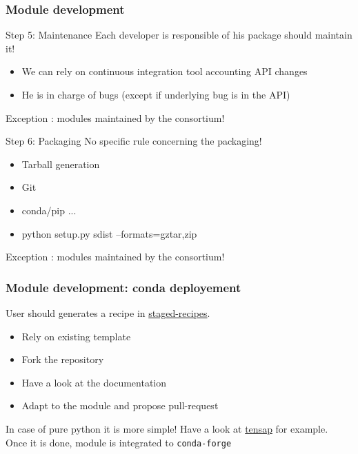 \documentclass[8pt]{beamer}
\begin{document}
\begin{frame}
  \frametitle{Module development}
  \begin{block}{Step 5: Maintenance}
    Each developer is responsible of his package should maintain it!
    \begin{itemize}
    \item We can rely on continuous integration tool accounting API changes
    \item He is in charge of bugs (except if underlying bug is in the API)
    \end{itemize}
    Exception : modules maintained by the consortium!
  \end{block}
  
  \begin{block}{Step 6: Packaging}
    No specific rule concerning the packaging!
    \begin{itemize}
    \item Tarball generation
    \item Git
    \item conda\slash pip ...
    \item \ttfamily python setup.py sdist --formats=gztar,zip  
    \end{itemize}
    Exception : modules maintained by the consortium!
  \end{block}
\end{frame}

\begin{frame}
  \frametitle{Module development: conda deployement}
  \begin{block}{}
    User should generates a recipe in \href{https://github.com/conda-forge/staged-recipes}{staged-recipes}.
    \begin{itemize}
    \item Rely on existing template
    \item Fork the repository
    \item Have a look at the documentation
    \item Adapt to the module and propose pull-request
    \end{itemize}
    In case of pure python it is more simple! Have a look at \href{https://github.com/conda-forge/staged-recipes/pull/14533}{tensap} for example.\\
    Once it is done, module is integrated to \texttt{conda-forge}
  \end{block}
\end{frame}
\end{document}
